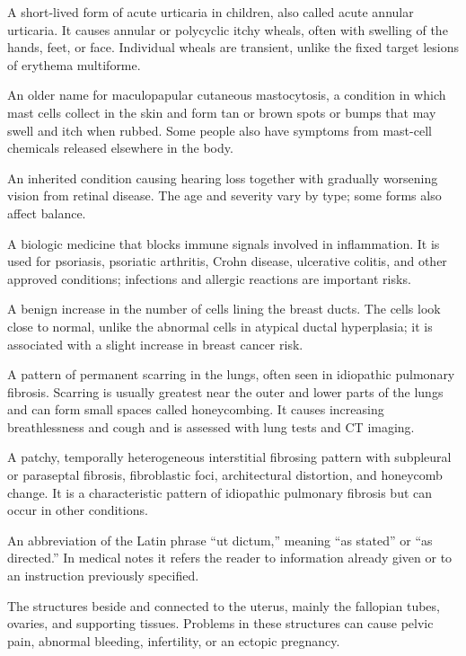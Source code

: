  A short-lived form of acute urticaria in children, also called acute annular urticaria. It causes annular or polycyclic itchy wheals, often with swelling of the hands, feet, or face. Individual wheals are transient, unlike the fixed target lesions of erythema multiforme.

 An older name for maculopapular cutaneous mastocytosis, a condition in which mast cells collect in the skin and form tan or brown spots or bumps that may swell and itch when rubbed. Some people also have symptoms from mast-cell chemicals released elsewhere in the body.

 An inherited condition causing hearing loss together with gradually worsening vision from retinal disease. The age and severity vary by type; some forms also affect balance.

 A biologic medicine that blocks immune signals involved in inflammation. It is used for psoriasis, psoriatic arthritis, Crohn disease, ulcerative colitis, and other approved conditions; infections and allergic reactions are important risks.

 A benign increase in the number of cells lining the breast ducts. The cells look close to normal, unlike the abnormal cells in atypical ductal hyperplasia; it is associated with a slight increase in breast cancer risk.

 A pattern of permanent scarring in the lungs, often seen in idiopathic pulmonary fibrosis. Scarring is usually greatest near the outer and lower parts of the lungs and can form small spaces called honeycombing. It causes increasing breathlessness and cough and is assessed with lung tests and CT imaging.

 A patchy, temporally heterogeneous interstitial fibrosing pattern with subpleural or paraseptal fibrosis, fibroblastic foci, architectural distortion, and honeycomb change. It is a characteristic pattern of idiopathic pulmonary fibrosis but can occur in other conditions.

 An abbreviation of the Latin phrase “ut dictum,” meaning “as stated” or “as directed.” In medical notes it refers the reader to information already given or to an instruction previously specified.

 The structures beside and connected to the uterus, mainly the fallopian tubes, ovaries, and supporting tissues. Problems in these structures can cause pelvic pain, abnormal bleeding, infertility, or an ectopic pregnancy.

